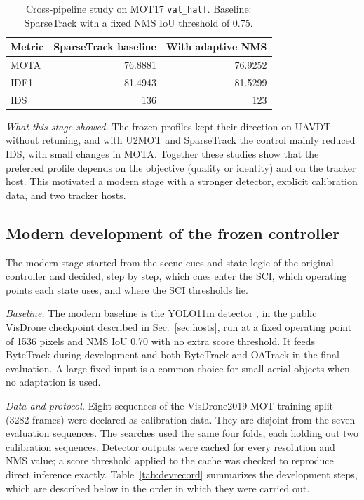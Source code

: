 \documentclass[journal]{new-aiaa}
\begin{document}
\begin{table}[htbp]
\caption{Cross-pipeline study on MOT17 \texttt{val\_half}. Baseline:
SparseTrack with a fixed NMS IoU threshold of 0.75.}
\label{tab:sparsetrack}
\centering\footnotesize
\setlength{\tabcolsep}{4pt}
\begin{tabular}{@{}lrr@{}}
\toprule
Metric & SparseTrack baseline & With adaptive NMS\\
\midrule
MOTA & 76.8881 & 76.9252\\
IDF1 & 81.4943 & 81.5299\\
IDS & 136 & 123\\
\bottomrule
\end{tabular}
\end{table}

\emph{What this stage showed.} The frozen profiles kept their direction on
UAVDT without retuning, and with U2MOT and SparseTrack the control mainly
reduced IDS, with small changes in MOTA. Together these
studies show that the preferred profile depends on the objective (quality or
identity) and on the tracker host. This motivated a modern stage with a
stronger detector, explicit calibration data, and two tracker hosts.

\subsection{Modern development of the frozen controller}\label{sec:modern}

The modern stage started from the scene cues and state logic of the original
controller and decided, step by step, which cues enter the SCI, which
operating points each state uses, and where the SCI thresholds lie.

\emph{Baseline.} The modern baseline is the YOLO11m detector
\cite{jocher2024yolo11}, in the public VisDrone checkpoint described in
Sec.~\ref{sec:hosts}, run at a fixed operating point of 1536 pixels and NMS
IoU 0.70 with no extra score threshold. It feeds ByteTrack
\cite{zhang2022bytetrack} during development and both ByteTrack and OATrack
\cite{qi2026oatrack} in the final evaluation. A large fixed input is a common
choice for small aerial objects when no adaptation is used.

\emph{Data and protocol.} Eight sequences of the VisDrone2019-MOT training split
(3282 frames) were declared as calibration data. They are disjoint from the
seven evaluation sequences. The searches used the same four folds, each
holding out two calibration sequences. Detector outputs were cached for
every resolution and NMS value; a score threshold applied to the cache was
checked to reproduce direct inference exactly. Table~\ref{tab:devrecord}
summarizes the development steps, which are described below in the order in
which they were carried out.
\end{document}
